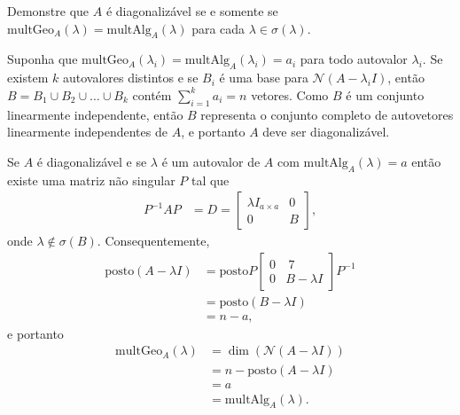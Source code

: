 \documentclass[a4paper,12pt, leqno, answers]{exam}
\begin{document}
\begin{questions}
     Demonstre que $A$ \'{e} diagonaliz\'{a}vel se e somente se $\mathrm{multGeo}_A(\lambda) = \mathrm{multAlg}_A(\lambda)$ para cada $\lambda \in \sigma(\lambda)$.
    \begin{solution}
        Suponha que $\mathrm{multGeo}_A(\lambda_i) = \mathrm{multAlg}_A(\lambda_i) = a_i$ para todo autovalor $\lambda_i$. Se existem $k$ autovalores distintos e se $B_i$ \'{e} uma base para $\mathcal{N}(A - \lambda_i I)$, ent\~{a}o $B = B_1 \cup B_2 \cup \ldots \cup B_k$ cont\'{e}m $\sum_{i = 1}^k a_i = n$ vetores. Como $B$ \'{e} um conjunto linearmente independente, ent\~{a}o $B$ representa o conjunto completo de autovetores linearmente independentes de $A$, e portanto $A$ deve ser diagonaliz\'{a}vel.

        Se $A$ \'{e} diagonaliz\'{a}vel e se $\lambda$ \'{e} um autovalor de $A$ com $\mathrm{multAlg}_A(\lambda) = a$ ent\~{a}o existe uma matriz n\~{a}o singular $P$ tal que
        \begin{align*}
            P^{-1} A P &= D = \begin{bmatrix}
                \lambda I_{a \times a} & 0 \\
                0 & B
            \end{bmatrix},
        \end{align*}
        onde $\lambda \not\in \sigma(B)$. Consequentemente,
        \begin{align*}
            \mathrm{posto}(A - \lambda I) &= \mathrm{posto} P \begin{bmatrix}
                0 & \ 7 \\
                0 & B - \lambda I
            \end{bmatrix} P^{-1} \\
            &= \mathrm{posto}(B - \lambda I) \\
            &= n - a,
        \end{align*}
        e portanto
        \begin{align*}
            \mathrm{multGeo}_A(\lambda) &= \dim(\mathcal{N}(A - \lambda I)) \\
            &= n - \mathrm{posto}(A - \lambda I) \\
            &= a \\
            &= \mathrm{multAlg}_A(\lambda).
        \end{align*}
    \end{solution}


\end{questions}
\end{document}

